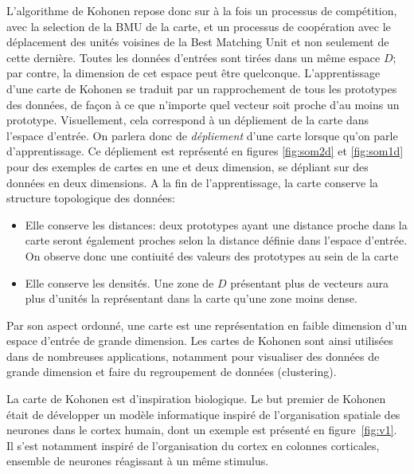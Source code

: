 L'algorithme de Kohonen repose donc sur à la fois un processus de compétition, avec la selection de la BMU de la carte, et un processus de coopération avec le déplacement des unités voisines de la Best Matching Unit et non seulement de cette dernière.
Toutes les données d'entrées sont tirées dans un même espace $D$; par contre, la dimension de cet espace peut être quelconque.
L'apprentissage d'une carte de Kohonen se traduit par un rapprochement de tous les prototypes des données, de façon à ce que n'importe quel vecteur soit proche d'au moins un prototype. Visuellement, cela correspond à un dépliement de la carte dans l'espace d'entrée. On parlera donc de \emph{dépliement} d'une carte lorsque qu'on parle d'apprentissage. Ce dépliement est représenté en figures \ref{fig:som2d} et \ref{fig:som1d} pour des exemples de cartes en une et deux dimension, se dépliant sur des données en deux dimensions. 
A la fin de l'apprentissage, la carte conserve la structure topologique des données:
\begin{itemize}
\item Elle conserve les distances: deux prototypes ayant une distance proche dans la carte seront également proches selon la distance définie dans l'espace d'entrée. On observe donc une contiuité des valeurs des prototypes au sein de la carte
\item Elle conserve les densités. Une zone de $D$ présentant plus de vecteurs aura plus d'unités la représentant dans la carte qu'une zone moins dense.
\end{itemize}
Par son aspect ordonné, une carte est une représentation en faible dimension d'un espace d'entrée de grande dimension. Les cartes de Kohonen sont ainsi utilisées dans de nombreuses applications, notamment pour visualiser des données de grande dimension et faire du regroupement de données (clustering). 

La carte de Kohonen est d'inspiration biologique. Le but premier de Kohonen était de développer un modèle informatique inspiré de l'organisation spatiale des neurones dans le cortex humain, dont un exemple est présenté en figure~\ref{fig:v1}. Il s'est notamment inspiré de l'organisation du cortex en colonnes corticales, ensemble de neurones réagissant à un même stimulus.

